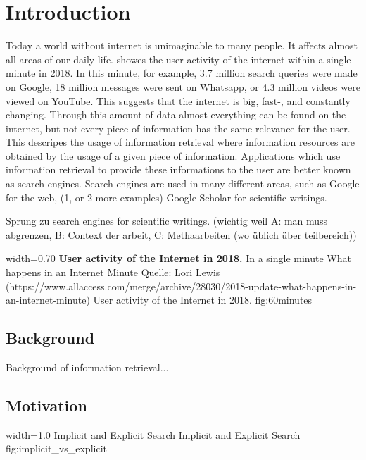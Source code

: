 \chapter{Introduction}
\label{cha:introduction}

Today a world without internet is unimaginable to many people. It affects almost all areas of our daily life.  showes the user activity of the internet within a single minute in 2018. In this minute, for example, 3.7 million search queries were made on Google, 18 million messages were sent on Whatsapp, or 4.3 million videos were viewed on YouTube. This suggests that the internet is big, fast-, and constantly changing. Through this amount of data almost everything can be found on the internet, but not every piece of information has the same relevance for the user. This descripes the usage of information retrieval where information resources are obtained by the usage of a given piece of information. Applications which use information retrieval to provide these informations to the user are better known as search engines. Search engines are used in many different areas, such as Google for the web,  (1, or 2 more examples) Google Scholar for scientific writings.

Sprung zu search engines for scientific writings. (wichtig weil A: man muss abgrenzen, B: Context der arbeit, C: Methaarbeiten (wo üblich über teilbereich))

      {width=0.70\textwidth}
      {\textbf{User activity of the Internet in 2018.} In a single minute What happens in an Internet Minute  Quelle: Lori Lewis (https://www.allaccess.com/merge/archive/28030/2018-update-what-happens-in-an-internet-minute)}
      {User activity of the Internet in 2018.}
      {fig:60minutes}

\section{Background}
\label{sec:background}

Background of information retrieval...

\section{Motivation}
\label{sec:Motivation}

      {width=1.0\textwidth}
      {Implicit and Explicit Search}
      {Implicit and Explicit Search}
      {fig:implicit_vs_explicit}

